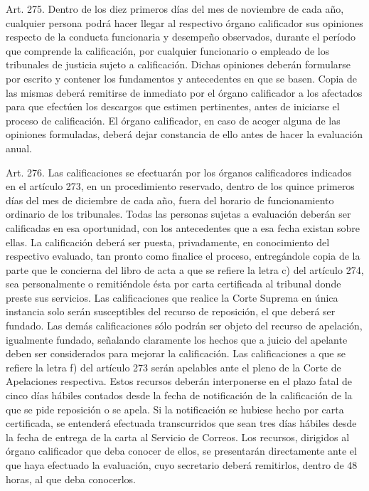    Art. 275. Dentro de los diez primeros días del mes de noviembre de cada año, cualquier persona podrá hacer llegar al respectivo órgano calificador sus opiniones respecto de la conducta funcionaria y desempeño observados, durante el período que comprende la calificación, por cualquier funcionario o empleado de los tribunales de justicia sujeto a calificación.
    Dichas opiniones deberán formularse por escrito y contener los fundamentos y antecedentes en que se basen. Copia de las mismas deberá remitirse de inmediato por el órgano calificador a los afectados para que efectúen los descargos que estimen pertinentes, antes de iniciarse el proceso de calificación. El órgano calificador, en caso de acoger alguna de las opiniones formuladas, deberá dejar constancia de ello antes de hacer la evaluación anual.


    Art. 276. Las calificaciones se efectuarán por los órganos calificadores indicados en el artículo 273, en un procedimiento reservado, dentro de los quince primeros días del mes de diciembre de cada año, fuera del horario de funcionamiento ordinario de los tribunales.
    Todas las personas sujetas a evaluación deberán ser calificadas en esa oportunidad, con los antecedentes que a esa fecha existan sobre ellas.
    La calificación deberá ser puesta, privadamente, en conocimiento del respectivo evaluado, tan pronto como finalice el proceso, entregándole copia de la parte que le concierna del libro de acta a que se refiere la letra c) del artículo 274, sea personalmente o remitiéndole ésta por carta certificada al tribunal donde preste sus servicios.
    Las calificaciones que realice la Corte Suprema en única instancia solo serán susceptibles del recurso de reposición, el que deberá ser fundado.
    Las demás calificaciones sólo podrán ser objeto del recurso de apelación, igualmente fundado, señalando claramente los hechos que a juicio del apelante deben ser considerados para mejorar la calificación. Las calificaciones a que se refiere la letra f) del artículo 273 serán apelables ante el pleno de la Corte de Apelaciones respectiva.
    Estos recursos deberán interponerse en el plazo fatal de cinco días hábiles contados desde la fecha de notificación de la calificación de la que se pide reposición o se apela. Si la notificación se hubiese hecho por carta certificada, se entenderá efectuada transcurridos que sean tres días hábiles desde la fecha de entrega de la carta al Servicio de Correos. Los recursos, dirigidos al órgano calificador que deba conocer de ellos, se presentarán directamente ante el que haya efectuado la evaluación, cuyo secretario deberá remitirlos, dentro de 48 horas, al que deba conocerlos.
